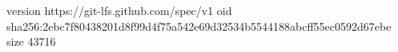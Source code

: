 version https://git-lfs.github.com/spec/v1
oid sha256:2ebc7f80438201d8f99d4f75a542e69d32534b5544188abcff55ec0592d67ebe
size 43716
